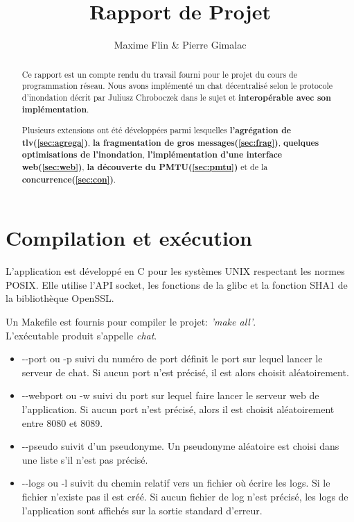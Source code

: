 \documentclass[a4paper,10pt]{article} %
\author{Maxime Flin \& Pierre Gimalac}
\title{Rapport de Projet}
\begin{document}
\maketitle

\begin{abstract}
  Ce rapport est un compte rendu du travail fourni pour le projet du cours de programmation réseau. Nous avons implémenté un chat décentralisé selon le protocole d'inondation décrit par Juliusz Chroboczek dans le sujet et \textbf{interopérable avec son implémentation}.

  Plusieurs extensions ont été développées parmi lesquelles \textbf{l'agrégation de tlv(\ref{sec:agrega})}, \textbf{la fragmentation de gros messages(\ref{sec:frag})}, \textbf{quelques optimisations de l’inondation}, \textbf{l'implémentation d'une interface web(\ref{sec:web})}, \textbf{la découverte du PMTU(\ref{sec:pmtu})} et de la \textbf{concurrence(\ref{sec:con})}.
\end{abstract}

\section{Compilation et exécution\label{sec:exec}}
L'application est développé en C pour les systèmes UNIX respectant les normes POSIX. Elle utilise l'API socket, les fonctions de la \textrm{glibc} et la fonction \textrm{SHA1} de la bibliothèque \textrm{OpenSSL}.

Un \textrm{Makefile} est fournis pour compiler le projet:  \textit{'make all'}.\\

L'exécutable produit s'appelle \textit{chat}.
\begin{itemize}
\item \textrm{-{}-port} ou \textrm{-p} suivi du numéro de port définit le port sur lequel lancer le serveur de chat. Si aucun port n'est précisé, il est alors choisit aléatoirement.
\item \textrm{-{}-webport} ou \textrm{-w} suivi du port sur lequel faire lancer le serveur web de l'application. Si aucun port n'est précisé, alors il est choisit aléatoirement entre 8080 et 8089.
\item \textrm{-{}-pseudo} suivit d'un pseudonyme. Un pseudonyme aléatoire est choisi dans une liste s'il n'est pas précisé.
\item \textrm{-{}-logs} ou \textrm{-l} suivit du chemin relatif vers un fichier où écrire les logs. Si le fichier n'existe pas il est créé. Si aucun fichier de log n'est précisé, les logs de l'application sont affichés sur la sortie standard d'erreur.
\end{itemize}
\end{document}
